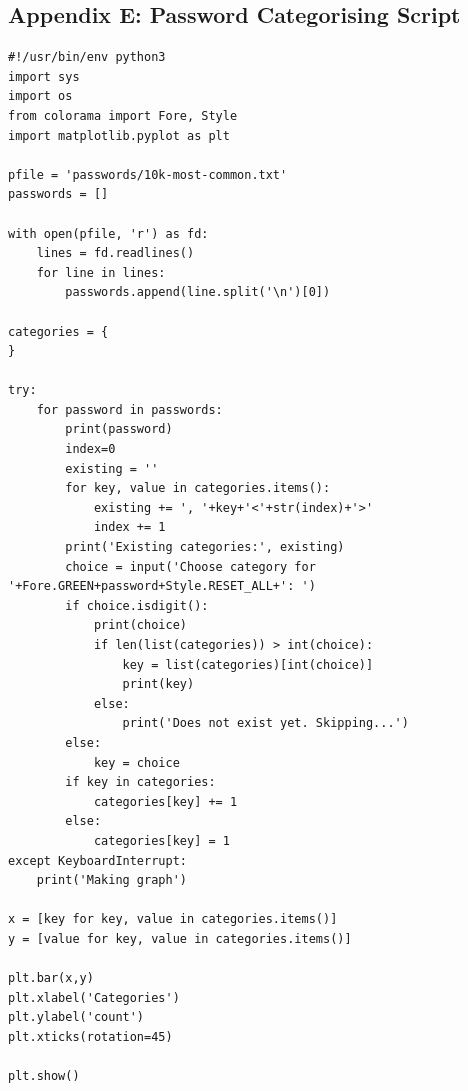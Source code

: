 \documentclass[a4paper,12pt]{article}
\begin{document}
\subsection{Appendix E: Password Categorising Script}
\label{app:pwordcatscript}
\begin{lstlisting}
#!/usr/bin/env python3
import sys
import os
from colorama import Fore, Style
import matplotlib.pyplot as plt

pfile = 'passwords/10k-most-common.txt'
passwords = []

with open(pfile, 'r') as fd:
    lines = fd.readlines()
    for line in lines:
        passwords.append(line.split('\n')[0])

categories = {
}

try:
    for password in passwords:
        print(password)
        index=0
        existing = ''
        for key, value in categories.items():
            existing += ', '+key+'<'+str(index)+'>'
            index += 1
        print('Existing categories:', existing)
        choice = input('Choose category for '+Fore.GREEN+password+Style.RESET_ALL+': ')
        if choice.isdigit():
            print(choice)
            if len(list(categories)) > int(choice):
                key = list(categories)[int(choice)]
                print(key)
            else:
                print('Does not exist yet. Skipping...')
        else:
            key = choice
        if key in categories:
            categories[key] += 1
        else:
            categories[key] = 1
except KeyboardInterrupt:
    print('Making graph')

x = [key for key, value in categories.items()]
y = [value for key, value in categories.items()]

plt.bar(x,y)
plt.xlabel('Categories')
plt.ylabel('count')
plt.xticks(rotation=45)
           
plt.show()
\end{lstlisting}
\end{document}

